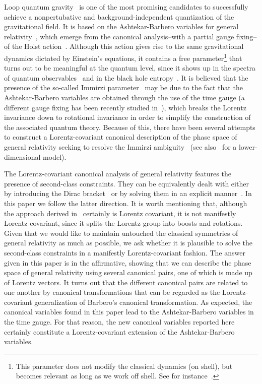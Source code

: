 \documentclass[aps,prd,reprint,showpacs,longbibliography,superscriptaddress, groupedaddres,
titlepage,nofootinbib]{revtex4-1} %
\begin{document}
Loop quantum gravity~\cite{rovelli2004quantum,AshLewcqg2115,thiemann2007modern,RovelliLR,*Rovellicag2815} is one of the most promising candidates to successfully achieve a nonpertubative and background-independent quantization of the gravitational field. It is based on the Ashtekar-Barbero variables for general relativity~\cite{Barbero}, which emerge from the canonical analysis--with a partial gauge fixing--of the Holst action~\cite{Holst}. Although this action gives rise to the same gravitational dynamics dictated by Einstein's equations, it contains a free parameter\footnote{This parameter does not modify the classical dynamics (on shell), but becomes relevant as long as we work off shell. See for instance~\cite{RefGSGR}.} that turns out to be meaningful at the quantum level, since it shows up in the spectra of quantum observables~\cite{RoveSmolinNucP442,*AshtLewacqg14} and in the black hole entropy~\cite{RovPRLt.77.3288,*AshBaezcqg105,*Meisscqg21,*Agulloetcprl100,*EngleNuiPRL105}. It is believed that the presence of the so-called  Immirzi parameter~\cite{Immirzicqg1410} may be due to the fact that the Ashtekar-Barbero variables are obtained through the use of the time gauge (a different gauge fixing has been recently studied in~\cite{Liu_Noui}), which breaks the Lorentz invariance down to rotational invariance in order to simplify the construction of the associated quantum theory. Because of this, there have been several attempts to construct a Lorentz-covariant canonical description of the phase space of general relativity seeking to resolve the Immirzi ambiguity~\cite{Alexcqg1720,*AlexVassprd644,*AlexLivprd674,Cianfraniprl,NouiSIGMA72011,*Nouiprd84044002} (see also~\cite{Nouiprd9110} for a lower-dimensional model).

The Lorentz-covariant canonical analysis of general relativity features the presence of second-class constraints. They can be equivalently dealt with either by introducing the Dirac bracket~\cite{Alexcqg1720,*AlexVassprd644,*AlexLivprd674} or by solving them in an explicit manner~\cite{Barros,NouiSIGMA72011,*Nouiprd84044002,CelMontesRom}. In this paper we follow the latter direction. It is worth mentioning that, although the approach derived in~\cite{Barros,CelMontesRom} certainly is Lorentz covariant, it is not manifestly Lorentz covariant, since it splits the Lorentz group into boosts and rotations. Given that we would like to maintain untouched the classical symmetries of general relativity as much as possible, we ask whether it is plausible to solve the second-class constraints in a manifestly Lorentz-covariant fashion. The answer given in this paper is in the affirmative, showing that we can describe the phase space of general relativity using several canonical pairs, one of which is made up of Lorentz vectors. It turns out that the different canonical pairs are related to one another by canonical transformations that can be regarded as the Lorentz-covariant generalization of Barbero's canonical transformation. As expected, the canonical variables found in this paper lead to the Ashtekar-Barbero variables in the time gauge. For that reason, the new canonical variables reported here certainly constitute a Lorentz-covariant extension of the Ashtekar-Barbero variables.
\end{document}
